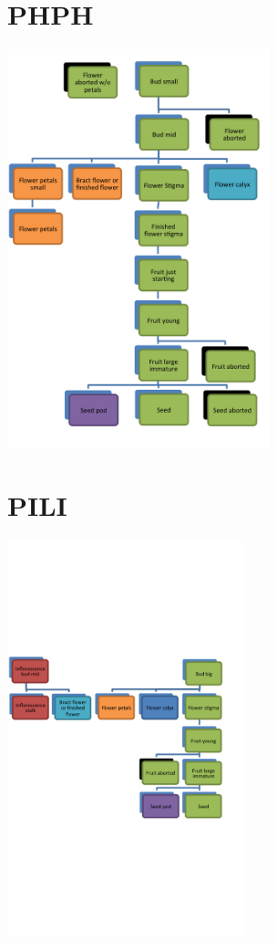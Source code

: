 \documentclass[10pt]{book} %
\begin{document}
\clearpage
\newpage
\section{PHPH}
\begin{multicols}{2}
\includegraphics[width=3in]{PHPH.png}
\vfill
\columnbreak

\end{multicols}



\clearpage
\newpage
\section{PILI}
\begin{multicols}{2}
\includegraphics[width=2.7in]{PILI.png}
\vfill
\columnbreak

\end{multicols}
\end{document}
